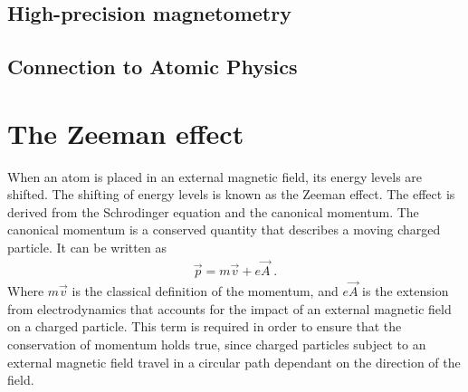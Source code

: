         \subsection{High-precision magnetometry}\label{sec:High-Precision-magnetometry}
        \subsection{Connection to Atomic Physics}\label{sec:Connection_To_AMO}

    \section{The Zeeman effect}\label{sec:quadratic_zeeman}
        When an atom is placed in an external magnetic field, its energy levels are shifted. The shifting of energy levels is known as the Zeeman effect. The effect is derived from the Schrodinger equation and the canonical momentum. The canonical momentum is a conserved quantity that describes a moving charged particle. It can be written as 
        \begin{align}
            \vec{p} = m\vec{v} + e\vec{A}\;.
        \end{align}
        \noindent Where $m\vec{v}$ is the classical definition of the momentum, and $e\vec{A}$ is the extension from electrodynamics that accounts for the impact of an external magnetic field on a charged particle. This term is required in order to ensure that the conservation of momentum holds true, since charged particles subject to an external magnetic field travel in a circular path dependant on the direction of the field.\\
        

